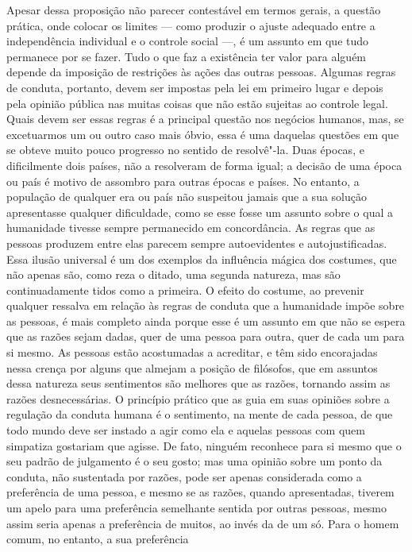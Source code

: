  Apesar dessa proposição não parecer contestável em termos gerais, a
questão prática, onde colocar os limites --- como produzir o ajuste
adequado entre a independência individual e o controle social ---, é um
assunto em que tudo permanece por se fazer. Tudo o que faz a
existência ter valor para alguém depende da imposição de restrições
às ações das outras pessoas. Algumas regras de conduta, portanto,
devem ser impostas pela lei em primeiro lugar e depois pela opinião
pública nas muitas coisas que não estão sujeitas ao controle legal.
Quais devem ser essas regras é a principal questão nos negócios
humanos, mas, se excetuarmos um ou outro caso mais óbvio, essa é uma
daquelas questões em que se obteve muito pouco progresso no
sentido de resolvê"-la. Duas épocas, e dificilmente dois países, não
a resolveram de forma igual; a decisão de uma época ou país é motivo
de assombro para outras épocas e países. No entanto, a população de
qualquer era ou país não suspeitou jamais que a sua solução
apresentasse qualquer dificuldade, como se esse fosse um assunto sobre
o qual a humanidade tivesse sempre permanecido em concordância. As regras
que as pessoas produzem entre elas parecem sempre autoevidentes e
autojustificadas. Essa ilusão universal é um dos exemplos da
influência mágica dos costumes, que não apenas são, como reza o ditado,
uma segunda natureza, mas são continuadamente tidos como a
primeira. O efeito do costume, ao  prevenir qualquer \mbox{ressalva} em relação
às regras de conduta que a humanidade impõe sobre as pessoas, é mais
completo ainda porque esse é um assunto em que não se espera que as
razões sejam dadas, quer de uma pessoa para outra, quer de cada um para
si mesmo. As pessoas estão acostumadas a acreditar, e têm sido
encorajadas nessa crença por alguns que almejam a posição de filósofos,
que em assuntos dessa natureza seus sentimentos são melhores que
as razões, tornando assim as razões desnecessárias. O princípio prático que as
guia em suas opiniões sobre a regulação da conduta humana é o
sentimento, na mente de cada pessoa, de que todo mundo deve ser instado
a agir como ela e aquelas pessoas com quem simpatiza gostariam
que agisse. De fato, ninguém reconhece para si mesmo que o seu padrão
de julgamento é o seu gosto; mas uma opinião sobre um ponto da conduta,
não sustentada por razões, pode ser apenas considerada como a
preferência de uma pessoa, e mesmo se as razões, quando apresentadas,
tiverem um apelo para uma preferência semelhante sentida por outras
pessoas, mesmo assim seria apenas a preferência de muitos, ao invés da
de um só. Para o homem comum, no entanto, a sua preferência
